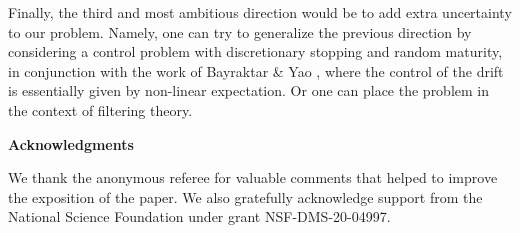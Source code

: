 \documentclass[11pt,tbtags,reqno]{article}
\theoremstyle{definition}
\numberwithin{equation}{section}
\theoremstyle{definition}
\begin{document}
Finally, the third and most ambitious direction would be to add extra uncertainty to our problem. Namely, one can try to generalize the previous direction by considering a control problem with discretionary stopping and random maturity, in conjunction with the work of Bayraktar \& Yao \cite{BayYao17}, where the control of the drift is essentially given by non-linear expectation. Or one can place the problem in the context of filtering theory.

\vspace{15pt}
\noindent
\textbf{Acknowledgments}

We thank the anonymous referee for valuable comments that helped to improve the exposition of the paper.
We also gratefully acknowledge support from the National Science Foundation under grant NSF-DMS-20-04997.
\end{document}
